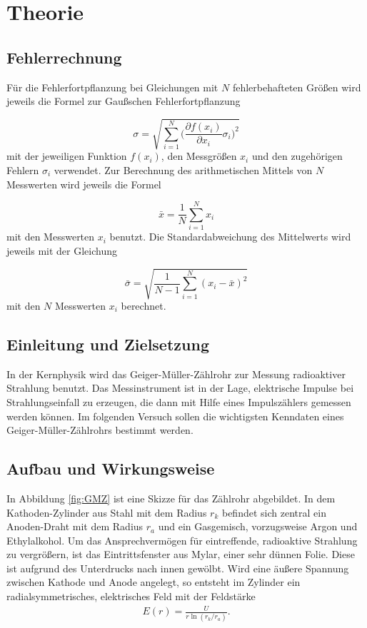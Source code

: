 \section{Theorie}
\label{sec:Theorie}

\subsection{Fehlerrechnung}

Für die Fehlerfortpflanzung bei Gleichungen mit $N$ fehlerbehafteten Größen
wird jeweils die Formel zur Gaußschen Fehlerfortpflanzung

\begin{equation}
  \sigma = \sqrt{\sum_{i=1}^{N}\biggl(\frac{\partial f(x_i)}{\partial x_i}
  \sigma_i\biggr)^2}
\end{equation}
mit der jeweiligen Funktion $f(x_i)$, den Messgrößen $x_i$ und den
zugehörigen Fehlern $\sigma_i$ verwendet.
Zur Berechnung des arithmetischen Mittels von $N$ Messwerten wird jeweils die
Formel

\begin{equation}
  \bar{x} = \frac{1}{N}\sum_{i=1}^{N}x_i
\end{equation}
mit den Messwerten $x_i$ benutzt.
Die Standardabweichung des Mittelwerts wird jeweils mit der Gleichung

\begin{equation}
  \bar{\sigma} = \sqrt{\frac{1}{N-1}\sum_{i=1}^{N}(x_i - \bar{x})^2}
\end{equation}
mit den $N$ Messwerten $x_i$ berechnet.

\subsection{Einleitung und Zielsetzung}

In der Kernphysik wird das Geiger-Müller-Zählrohr zur Messung
radioaktiver Strahlung benutzt. Das Messinstrument ist in der Lage, elektrische
Impulse bei Strahlungseinfall zu erzeugen, die dann mit Hilfe eines
Impulszählers gemessen werden können.
Im folgenden Versuch sollen die wichtigsten Kenndaten eines
Geiger-Müller-Zählrohrs bestimmt werden.

\subsection{Aufbau und Wirkungsweise}

In Abbildung \ref{fig:GMZ} ist eine Skizze für das Zählrohr abgebildet.
In dem Kathoden-Zylinder aus Stahl mit dem Radius $r_k$ befindet sich zentral
ein Anoden-Draht mit dem Radius $r_a$ und ein Gasgemisch, vorzugsweise Argon
und Ethylalkohol.
Um das Ansprechvermögen für eintreffende, radioaktive Strahlung zu vergrößern,
ist das Eintrittsfenster aus Mylar, einer sehr dünnen Folie. Diese ist
aufgrund des Unterdrucks nach innen gewölbt.
Wird eine äußere Spannung zwischen Kathode und Anode angelegt, so entsteht
im Zylinder ein radialsymmetrisches, elektrisches Feld mit der Feldstärke
\begin{align}
  E(r) = \frac{U}{r\ln(r_k/r_a)}.
\end{align}

